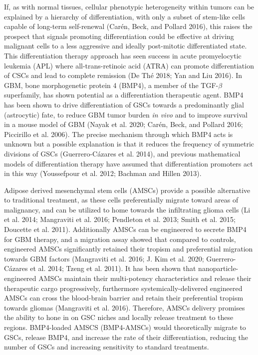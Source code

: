\documentclass[
  default,
]{sn-jnl}
\begin{document}
If, as with normal tissues, cellular phenotypic heterogeneity within
tumors can be explained by a hierarchy of differentiation, with only a
subset of stem-like cells capable of long-term self-renewal (Carén,
Beck, and Pollard 2016), this raises the prospect that signals promoting
differentiation could be effective at driving malignant cells to a less
aggressive and ideally post-mitotic differentiated state. This
differentiation therapy approach has seen success in acute promyelocytic
leukemia (APL) where all-trans-retinoic acid (ATRA) can promote
differentiation of CSCs and lead to complete remission (De Thé 2018; Yan
and Liu 2016). In GBM, bone morphogenetic protein 4 (BMP4), a member of
the TGF-\(\beta\) superfamily, has shown potential as a differentiation
therapeutic agent. BMP4 has been shown to drive differentiation of GSCs
towards a predominantly glial (astrocytic) fate, to reduce GBM tumor
burden \emph{in vivo} and to improve survival in a mouse model of GBM
(Nayak et al. 2020; Carén, Beck, and Pollard 2016; Piccirillo et al.
2006). The precise mechanism through which BMP4 acts is unknown but a
possible explanation is that it reduces the frequency of symmetric
divisions of GSCs (Guerrero-Cázares et al. 2014), and previous
mathematical models of differentiation therapy have assumed that
differentiation promoters act in this way (Youssefpour et al. 2012;
Bachman and Hillen 2013).

Adipose derived mesenchymal stem cells (AMSCs) provide a possible
alternative to traditional treatment, as these cells preferentially
migrate toward areas of malignancy, and can be utilized to home towards
the infiltrating glioma cells (Li et al. 2014; Mangraviti et al. 2016;
Pendleton et al. 2013; Smith et al. 2015; Doucette et al. 2011).
Additionally AMSCs can be engineered to secrete BMP4 for GBM therapy,
and a migration assay showed that compared to controls, engineered AMSCs
significantly retained their tropism and preferential migration towards
GBM factors (Mangraviti et al. 2016; J. Kim et al. 2020;
Guerrero-Cázares et al. 2014; Tzeng et al. 2011). It has been shown that
nanoparticle-engineered AMSCs maintain their multi-potency
characteristics and release their therapeutic cargo progressively,
furthermore systemically-delivered engineered AMSCs can cross the
blood-brain barrier and retain their preferential tropism towards
gliomas (Mangraviti et al. 2016). Therefore, AMSCs delivery promises the
ability to hone in on GSC niches and locally release treatment to these
regions. BMP4-loaded AMSCS (BMP4-AMSCs) would theoretically migrate to
GSCs, release BMP4, and increase the rate of their differentiation,
reducing the number of GSCs and increasing sensitivity to standard
treatments.
\end{document}
